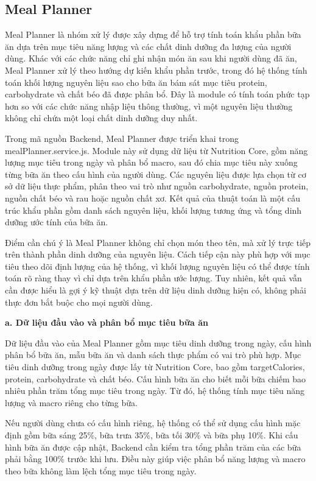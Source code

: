 \documentclass[12pt, a4paper]{report}
\begin{document}
\subsection{Meal Planner}Meal Planner là nhóm xử lý được xây dựng để hỗ trợ tính toán khẩu phần bữa ăn dựa trên mục tiêu năng lượng và các chất dinh dưỡng đa lượng của người dùng. Khác với các chức năng chỉ ghi nhận món ăn sau khi người dùng đã ăn, Meal Planner xử lý theo hướng dự kiến khẩu phần trước, trong đó hệ thống tính toán khối lượng nguyên liệu sao cho bữa ăn bám sát mục tiêu protein, carbohydrate và chất béo đã được phân bổ. Đây là module có tính toán phức tạp hơn so với các chức năng nhập liệu thông thường, vì một nguyên liệu thường không chỉ chứa một loại chất dinh dưỡng duy nhất.

Trong mã nguồn Backend, Meal Planner được triển khai trong mealPlanner.service.js. Module này sử dụng dữ liệu từ Nutrition Core, gồm năng lượng mục tiêu trong ngày và phân bổ macro, sau đó chia mục tiêu này xuống từng bữa ăn theo cấu hình của người dùng. Các nguyên liệu được lựa chọn từ cơ sở dữ liệu thực phẩm, phân theo vai trò như nguồn carbohydrate, nguồn protein, nguồn chất béo và rau hoặc nguồn chất xơ. Kết quả của thuật toán là một cấu trúc khẩu phần gồm danh sách nguyên liệu, khối lượng tương ứng và tổng dinh dưỡng ước tính của bữa ăn.

Điểm cần chú ý là Meal Planner không chỉ chọn món theo tên, mà xử lý trực tiếp trên thành phần dinh dưỡng của nguyên liệu. Cách tiếp cận này phù hợp với mục tiêu theo dõi định lượng của hệ thống, vì khối lượng nguyên liệu có thể được tính toán rõ ràng thay vì chỉ dựa trên khẩu phần ước lượng. Tuy nhiên, kết quả vẫn cần được hiểu là gợi ý kỹ thuật dựa trên dữ liệu dinh dưỡng hiện có, không phải thực đơn bắt buộc cho mọi người dùng.

\textbf{a. Dữ liệu đầu vào và phân bổ mục tiêu bữa ăn}

Dữ liệu đầu vào của Meal Planner gồm mục tiêu dinh dưỡng trong ngày, cấu hình phân bổ bữa ăn, mẫu bữa ăn và danh sách thực phẩm có vai trò phù hợp. Mục tiêu dinh dưỡng trong ngày được lấy từ Nutrition Core, bao gồm targetCalories, protein, carbohydrate và chất béo. Cấu hình bữa ăn cho biết mỗi bữa chiếm bao nhiêu phần trăm tổng mục tiêu trong ngày. Từ đó, hệ thống tính mục tiêu năng lượng và macro riêng cho từng bữa.

Nếu người dùng chưa có cấu hình riêng, hệ thống có thể sử dụng cấu hình mặc định gồm bữa sáng 25\%, bữa trưa 35\%, bữa tối 30\% và bữa phụ 10\%. Khi cấu hình bữa ăn được cập nhật, Backend cần kiểm tra tổng phần trăm của các bữa phải bằng 100\% trước khi lưu. Điều này giúp việc phân bổ năng lượng và macro theo bữa không làm lệch tổng mục tiêu trong ngày.
\end{document}

